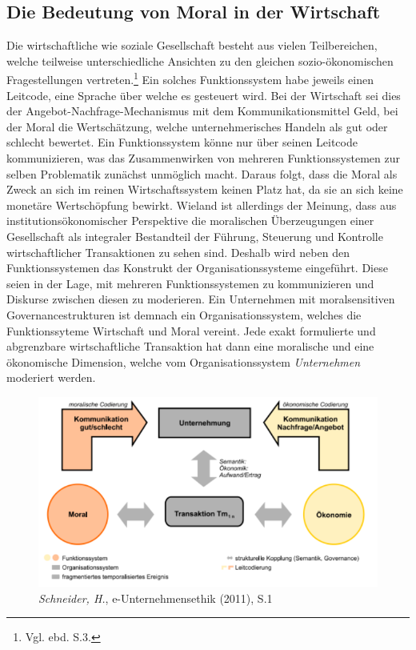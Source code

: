 \documentclass[12pt]{article}
\begin{document}
\subsection{Die Bedeutung von Moral in der Wirtschaft}
Die wirtschaftliche wie soziale Gesellschaft besteht aus vielen Teilbereichen, welche teilweise unterschiedliche Ansichten zu den gleichen sozio-ökonomischen Fragestellungen vertreten.\footnote{Vgl. ebd. S.3.} Ein solches Funktionssystem habe jeweils einen Leitcode, eine Sprache über welche es gesteuert wird. Bei der Wirtschaft sei dies der Angebot-Nachfrage-Mechanismus mit dem Kommunikationsmittel Geld, bei der Moral die Wertschätzung, welche unternehmerisches Handeln als gut oder schlecht bewertet. Ein Funktionssystem könne nur über seinen Leitcode kommunizieren, was das Zusammenwirken von mehreren Funktionssystemen zur selben Problematik zunächst unmöglich macht. Daraus folgt, dass die Moral als Zweck an sich im reinen Wirtschaftssystem keinen Platz hat, da sie an sich keine monetäre Wertschöpfung bewirkt. Wieland ist allerdings der Meinung, dass aus institutionsökonomischer Perspektive die moralischen Überzeugungen einer Gesellschaft als integraler Bestandteil der Führung, Steuerung und Kontrolle wirtschaftlicher Transaktionen zu sehen sind. Deshalb wird neben den Funktionssystemen das Konstrukt der Organisationssysteme eingeführt. Diese seien in der Lage, mit mehreren Funktionssystemen zu kommunizieren und Diskurse zwischen diesen zu moderieren. Ein Unternehmen mit moralsensitiven Governancestrukturen ist demnach ein Organisationssystem, welches die Funktionssyteme Wirtschaft und Moral vereint. Jede exakt formulierte und abgrenzbare wirtschaftliche Transaktion hat dann eine moralische und eine ökonomische Dimension, welche vom Organisationssystem \textit{Unternehmen} moderiert werden.
\FloatBarrier
\begin{figure}[ht!]
\centering
\includegraphics[width=.85\textwidth]{wieland1.png}
\caption{\textit{Schneider, H.}, e-Unternehmensethik (2011), S.1}
\end{figure}
\end{document}
